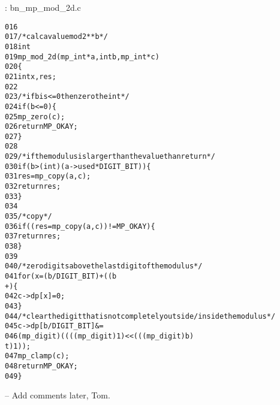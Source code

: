 \documentclass[b5paper]{book}
\begin{document}
\vspace{+3mm}\begin{small}
\hspace{-5.1mm}{\bf File}: bn\_mp\_mod\_2d.c
\vspace{-3mm}
\begin{alltt}
016   
017   /* calc a value mod 2**b */
018   int
019   mp_mod_2d (mp_int * a, int b, mp_int * c)
020   \{
021     int     x, res;
022   
023     /* if b is <= 0 then zero the int */
024     if (b <= 0) \{
025       mp_zero (c);
026       return MP_OKAY;
027     \}
028   
029     /* if the modulus is larger than the value than return */
030     if (b > (int) (a->used * DIGIT_BIT)) \{
031       res = mp_copy (a, c);
032       return res;
033     \}
034   
035     /* copy */
036     if ((res = mp_copy (a, c)) != MP_OKAY) \{
037       return res;
038     \}
039   
040     /* zero digits above the last digit of the modulus */
041     for (x = (b / DIGIT_BIT) + ((b % DIGIT_BIT) == 0 ? 0 : 1); x < c->used; x+
      +) \{
042       c->dp[x] = 0;
043     \}
044     /* clear the digit that is not completely outside/inside the modulus */
045     c->dp[b / DIGIT_BIT] &=
046       (mp_digit) ((((mp_digit) 1) << (((mp_digit) b) % DIGIT_BIT)) - ((mp_digi
      t) 1));
047     mp_clamp (c);
048     return MP_OKAY;
049   \}
\end{alltt}
\end{small}

-- Add comments later, Tom.
\end{document}
